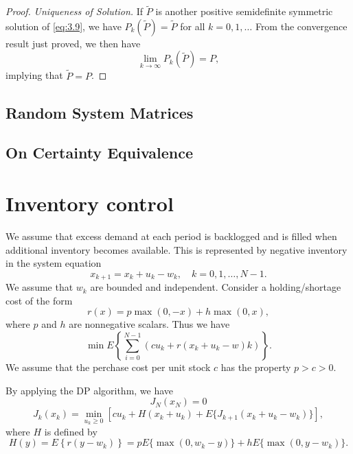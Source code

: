 \begin{proof}
\textit{Uniqueness of Solution.}
If $\tilde{P}$ is another positive semidefinite symmetric solution of \cref{eq:3.9}, we have $P_k(\tilde{P})=\tilde{P}$ for all $k=0,1,\dots$ From the convergence result just proved, we then have \[\lim_{k\rightarrow\infty} P_k(\tilde{P}) = P,\] implying that $\tilde{P}=P$.
\end{proof}

\subsection*{Random System Matrices}
\subsection*{On Certainty Equivalence}

\section{Inventory control}
We assume that excess demand at each period is backlogged and is filled when additional inventory becomes available. This is represented by negative inventory in the system equation
\[x_{k + 1} = x_k + u_k - w_k,\quad k = 0,1,\dots,N - 1.\]
We assume that $w_k$ are bounded and independent.
Consider a holding/shortage cost of the form 
\[r(x) = p \max(0, - x) + h\max(0,x),\]
where $p$ and $h$ are nonnegative scalars. Thus we have
\[\min E\left\{\sum_{i=0}^{N-1}(c u_k + r(x_k + u_k - w)k) \right\}.\]
We assume that the perchase cost per unit stock $c$ has the property $p>c>0$. 

By applying the DP algorithm, we have 
\[J_N(x_N) = 0\]
\begin{equation}
    J_k(x_k) =\min_{u_k\geq 0}\left[cu_k + H(x_k + u_k) + E\{J_{k + 1}(x_k + u_k - w_k)\}\right],\label{eq:3.23}
\end{equation}
where $H$ is defined by 
\[H(y) = E\left\{r(y - w_k)\right\} = pE\{\max(0,w_k - y)\} + hE\{\max(0,y - w_k)\}.\]
